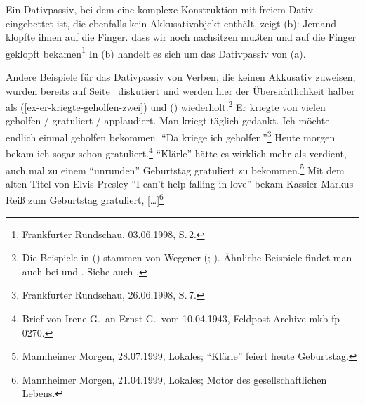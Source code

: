 Ein Dativpassiv, bei dem eine komplexe Konstruktion mit freiem Dativ eingebettet ist,
die ebenfalls kein Akkusativobjekt enthält, zeigt (b):
\eal
\ex Jemand klopfte ihnen auf die Finger.
\ex\label{bsp-auf-die-finger-geklopft-bekommen}
dass wir noch nachsitzen mußten und auf die Finger geklopft bekamen\footnote{
        Frankfurter Rundschau, 03.06.1998, S.\,2.%
}
\zl
In (b) handelt es sich um das Dativpassiv von (a).
%

Andere Beispiele für das Dativpassiv von Verben, die keinen Akkusativ
zuweisen, wurden bereits auf Seite~\pageref{ex-er-kriegte-geholfen}
diskutiert und werden hier der Übersichtlichkeit halber
als (\ref{ex-er-kriegte-geholfen-zwei}) und () wiederholt.\footnote{
        Die Beispiele in () stammen von Wegener (\citeyear[]{Wegener85a}; \citeyear[]{Wegener90}).
        Ähnliche Beispiele findet man auch bei  und
        . Siehe auch .%
}
\eal
\label{ex-er-kriegte-geholfen-zwei}
\ex{}
Er kriegte von vielen geholfen / gratuliert / applaudiert.
\ex{} 
Man kriegt täglich gedankt.
\ex Ich möchte endlich einmal geholfen bekommen.
\zl
\eal
\ex
"`Da kriege ich geholfen."'\footnote{
Frankfurter Rundschau, 26.06.1998, S.\,7.%
}
\ex
Heute morgen bekam ich sogar schon gratuliert.\footnote{%
Brief von Irene G.\ an Ernst G.\ vom 10.04.1943, Feldpost-Archive mkb-fp-0270.}
\ex
"`Klärle"' hätte es wirklich mehr als verdient, auch mal zu einem "`unrunden"' Geburtstag gratuliert zu bekommen.\footnote{
Mannheimer Morgen, 28.07.1999, Lokales; "`Klärle"' feiert heute Geburtstag.%
}
\ex Mit dem alten Titel von Elvis Presley "`I can't help falling in love"' 
    bekam Kassier Markus Reiß zum Geburtstag gratuliert, [\ldots]\footnote{
Mannheimer Morgen, 21.04.1999, Lokales; Motor des gesellschaftlichen Lebens.%
}
\zl

